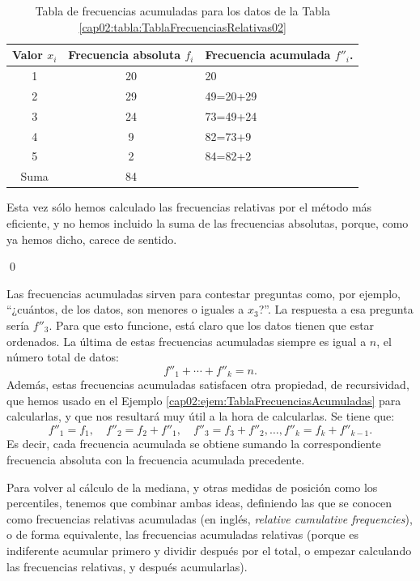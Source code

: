 \begin{ejemplo}
\begin{table}[ht]
\centering
\begin{tabular}{|c|c|l|}
  \hline
 Valor $x_i$& Frecuencia absoluta $f_i$ & Frecuencia acumulada $f''_i$.\\
  \hline
  1 & 20 & 20 \\
  2 & 29 & 49=20+29 \\
  3 & 24 & 73=49+24 \\
  4 & 9 & 82=73+9 \\
  5 & 2 & 84=82+2 \\
  \hline
  Suma & 84 & \multicolumn{1}{c}{}\\
  \cline{1-2}
\end{tabular}
\caption{Tabla de frecuencias acumuladas para los datos de la Tabla \ref{cap02:tabla:TablaFrecuenciasRelativas02}}
\label{cap02:tabla:TablaFrecuenciasAcumuladas02}
\end{table}

Esta vez sólo hemos calculado las frecuencias relativas por el método más eficiente, y no hemos incluido la suma de las frecuencias absolutas, porque, como ya hemos dicho, carece de sentido.

\qed
\end{ejemplo}

Las frecuencias acumuladas sirven para contestar preguntas como, por ejemplo, ``¿cuántos, de los datos, son menores o iguales a $x_3$?''. La respuesta a esa pregunta sería $f''_3$. Para que esto funcione, está claro que los datos tienen que estar ordenados. La última de estas frecuencias acumuladas siempre es igual a $n$, el número total de datos:
\[f''_1+\cdots+f''_k=n.\]
Además, estas frecuencias acumuladas satisfacen otra propiedad, de recursividad, que hemos usado en el Ejemplo \ref{cap02:ejem:TablaFrecuenciasAcumuladas} para calcularlas, y que nos resultará muy útil a la hora de calcularlas. Se tiene que:
\[f''_1=f_1,\quad f''_2=f_2+f''_1,\quad f''_3=f_3+f''_2,\ldots,f''_k=f_k+f''_{k-1}.\]
Es decir, cada frecuencia acumulada se obtiene sumando la correspondiente frecuencia absoluta con la frecuencia acumulada precedente.

Para volver al cálculo de la mediana, y otras medidas de posición como los percentiles, tenemos que combinar ambas ideas, definiendo las que se conocen como {\sf frecuencias relativas acumuladas} (en inglés, {\em relative cumulative frequencies}), o de forma equivalente, las {\sf frecuencias acumuladas relativas} (porque es indiferente acumular primero y dividir después por el total, o empezar calculando las frecuencias relativas, y después acumularlas).


